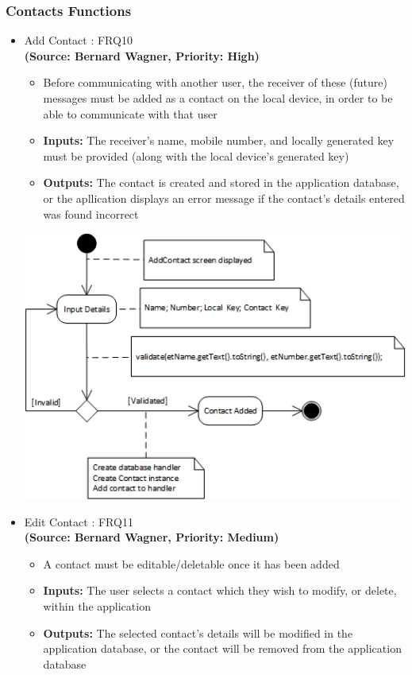 \subsubsection{Contacts Functions}
\begin{itemize}
\item{Add Contact : FRQ10}\\
\textbf{(Source: Bernard Wagner, Priority: High)}
\begin{itemize}
\item Before communicating with another user, the receiver of these (future) messages must be added as a contact on the local device, in order to be able to communicate with that user
\item \textbf{Inputs:} The receiver's name, mobile number, and locally generated key must be provided (along with the local device's generated key)
\item \textbf{Outputs:} The contact is created and stored in the application database, or the apllication displays an error message if the contact's details entered was found incorrect
\end{itemize}
 \includegraphics[width=13cm]{diagrams/StateDiagrams/AddContactStateDiagram.png}
\item{Edit Contact : FRQ11}\\
\textbf{(Source: Bernard Wagner, Priority: Medium)}
\begin{itemize}
\item A contact must be editable/deletable once it has been added
\item \textbf{Inputs:} The user selects a contact which they wish to modify, or delete, within the application
\item \textbf{Outputs:} The selected contact's details will be modified in the application database, or the contact will be removed from the application database

\end{itemize}
\end{itemize}
